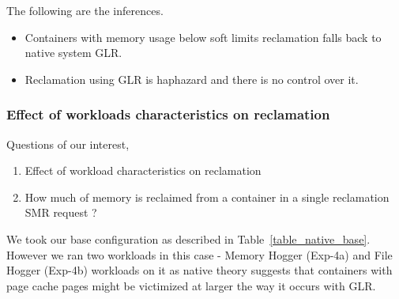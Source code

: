 	  The following are the inferences.
	  \begin{itemize}
	    \item Containers with memory usage below soft limits reclamation falls back to native system GLR.
	    \item Reclamation using GLR is haphazard and there is no control over it. 
	  \end{itemize}
   
     \subsubsection{Effect of workloads characteristics on reclamation}
      
	Questions of our interest,
	    \begin{enumerate}
	      \item Effect of workload characteristics on reclamation
	      \item How much of memory is reclaimed from a container in a single reclamation SMR request ?
	    \end{enumerate}
	  
	    We took our base configuration as described in Table~\ref{table_native_base}. However we ran two workloads in this case - Memory 
  Hogger (Exp-4a) and File Hogger (Exp-4b) workloads on it as native theory suggests that containers with page cache pages might be 
  victimized at larger the way it occurs with GLR.	
	  

